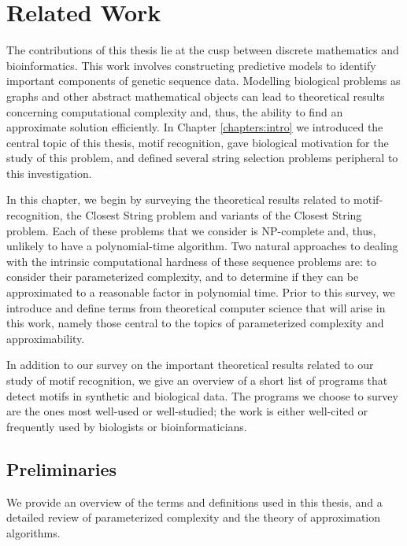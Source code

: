 \chapter{Related Work} \label{chapter:related_work}

The contributions of this thesis lie at the cusp between discrete mathematics and bioinformatics. This work involves constructing predictive models to identify important components of genetic sequence data. Modelling biological problems as graphs and other abstract mathematical objects can lead to theoretical results concerning computational complexity and, thus, the ability to find an approximate solution efficiently. In Chapter \ref{chapters:intro} we introduced the central topic of this thesis, motif recognition, gave biological motivation for the study of this problem, and defined several string selection  problems peripheral to this investigation. 

In this chapter, we begin by surveying the theoretical results related to motif-recognition, the {\sc Closest String} problem and variants of the {\sc Closest String} problem.  Each of these problems that we consider is NP-complete and, thus, unlikely to have a  polynomial-time algorithm. Two natural approaches to dealing with the intrinsic computational hardness of these sequence problems are: to consider their parameterized complexity, and to determine if they can be approximated to a reasonable factor in polynomial time.  Prior to this survey, we introduce and define terms from theoretical computer science that will arise in this work, namely those central to the topics of parameterized complexity and approximability. 

In addition to our survey on the important theoretical results related to our study of motif recognition, we give an overview of a short list of programs that detect motifs in synthetic and biological data.  The programs we choose to survey are the ones most well-used or well-studied; the work is either well-cited or frequently used by biologists or bioinformaticians.  
 
\section{Preliminaries}

We provide an overview of the terms and definitions used in this thesis, and a detailed review of parameterized complexity and the theory of approximation algorithms.  

